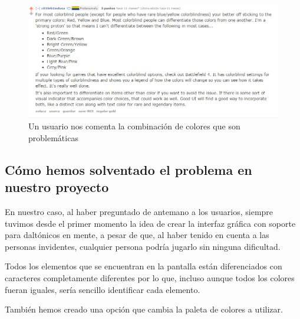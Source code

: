 \begin{figure}[H]
		\includegraphics[width=\textwidth,height=\textheight,keepaspectratio]{./img/redditcolorblind3.png}
	\caption{Un usuario nos comenta la combinación de colores que son problemáticas}
	\label{fig:roomsgamecolorblind3}
\end{figure}

\subsection{Cómo hemos solventado el problema en nuestro proyecto}

En nuestro caso, al haber preguntado de antemano a los usuarios, siempre tuvimos desde el primer momento la idea de crear la interfaz gráfica con soporte para daltónicos en mente, a pesar de que, al haber tenido en cuenta a las personas invidentes, cualquier persona podría jugarlo sin ninguna dificultad.

Todos los elementos que se encuentran en la pantalla están diferenciados con caracteres completamente diferentes por lo que, incluso aunque todos los colores fueran iguales, sería sencillo identificar cada elemento. 

También hemos creado una opción que cambia la paleta de colores a utilizar.

